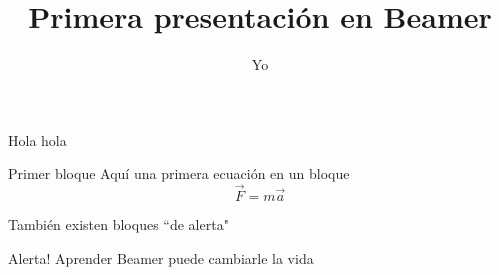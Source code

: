 \documentclass[draft]{beamer}
\begin{document}
\title{Primera presentaci\'on en Beamer}
\author{Yo}
\maketitle

\begin{frame}
Hola hola
\begin{block}{Primer bloque}
Aqu\'i una primera ecuaci\'on en un bloque
\begin{equation}
\vec{F}=m\vec{a}
\end{equation}
\end{block}

\end{frame}

\begin{frame}
Tambi\'en existen bloques ``de alerta"
\begin{alertblock}{Alerta!}
Aprender Beamer puede cambiarle la vida
\end{alertblock}
\end{frame}
\end{document}

